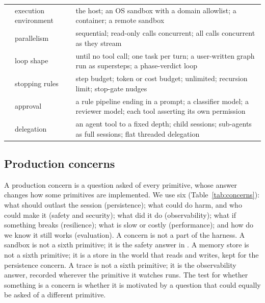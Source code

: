 \begin{table}[t]
\begin{tabularx}{\linewidth}{@{}l>{\raggedright\arraybackslash}p{3.1cm}Y@{}}
 & execution environment & the host; an OS sandbox with a domain allowlist; a container; a remote sandbox \\
 & parallelism & sequential; read-only calls concurrent; all calls concurrent as they stream \\
\addlinespace
{} & loop shape & until no tool call; one task per turn; a user-written graph run as supersteps; a phase-verdict loop \\
 & stopping rules & step budget; token or cost budget; unlimited; recursion limit; stop-gate nudges \\
 & approval & a rule pipeline ending in a prompt; a classifier model; a reviewer model; each tool asserting its own permission \\
 & delegation & an agent tool to a fixed depth; child sessions; sub-agents as full sessions; flat threaded delegation \\
\bottomrule
\end{tabularx}
\end{table}

\subsection{Production concerns}
A production concern is a question asked of every primitive, whose answer changes how some primitives are implemented. We use six (Table~\ref{tab:concerns}): what should outlast the session (persistence); what could do harm, and who could make it (safety and security); what did it do (observability); what if something breaks (resilience); what is slow or costly (performance); and how do we know it still works (evaluation). A concern is not a part of the harness. A sandbox is not a sixth primitive; it is the safety answer in . A memory store is not a sixth primitive; it is a store in the world that  reads and  writes, kept for the persistence concern. A trace is not a sixth primitive; it is the observability answer, recorded wherever the primitive it watches runs. The test for whether something is a concern is whether it is motivated by a question that could equally be asked of a different primitive.

